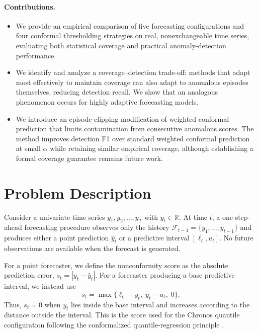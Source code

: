 \documentclass[11pt]{article}
\theoremstyle{definition}
\theoremstyle{remark}
\newcommand{\R}{\mathbb{R}}
\newcommand{\yhat}{\hat{y}}
\begin{document}
\paragraph{Contributions.}
\begin{itemize}[leftmargin=*,itemsep=2pt]
\item We provide an empirical comparison of five forecasting configurations and four conformal thresholding strategies on real, nonexchangeable time series, evaluating both statistical coverage and practical anomaly-detection performance.
\item We identify and analyze a coverage--detection trade-off: methods that adapt most effectively to maintain coverage can also adapt to anomalous episodes themselves, reducing detection recall. We show that an analogous phenomenon occurs for highly adaptive forecasting models.
\item We introduce an episode-clipping modification of weighted conformal prediction that limits contamination from consecutive anomalous scores. The method improves detection F1 over standard weighted conformal prediction at small $\alpha$ while retaining similar empirical coverage, although establishing a formal coverage guarantee remains future work.
\end{itemize}


\section{Problem Description}\label{sec:problem}

Consider a univariate time series $y_1, y_2, \ldots, y_T$ with $y_t \in \R$.
At time $t$, a one-step-ahead forecasting procedure observes only the history $\mathcal{F}_{t-1} = \{ y_1, \ldots, y_{t-1} \}$ and produces either a point prediction $\yhat_t$ or a predictive interval $[\ell_t, u_t]$. No future observations are available when the forecast is generated.

For a point forecaster, we define the nonconformity score as the absolute prediction error, $s_t = |y_t - \yhat_t|$. For a forecaster producing a base predictive interval, we instead use
\[
  s_t = \max\{ \ell_t - y_t,\; y_t - u_t,\; 0 \} .
\]
Thus, $s_t = 0$ when $y_t$ lies inside the base interval and increases according to the distance outside the interval. This is the score used for the Chronos quantile configuration following the conformalized quantile-regression principle \cite{romano2019conformalized}.
\end{document}

